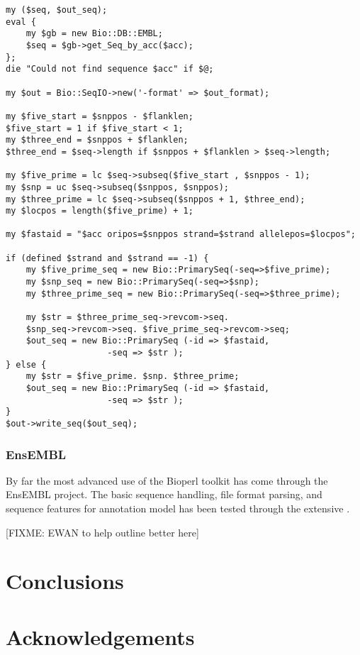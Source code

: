 \documentclass{article}
\begin{document}
\begin{twocolumn}
\begin{itemize}
\begin{scriptsize}
\begin{verbatim}
my ($seq, $out_seq);
eval {
    my $gb = new Bio::DB::EMBL;
    $seq = $gb->get_Seq_by_acc($acc);
};
die "Could not find sequence $acc" if $@;

my $out = Bio::SeqIO->new('-format' => $out_format);

my $five_start = $snppos - $flanklen;
$five_start = 1 if $five_start < 1;
my $three_end = $snppos + $flanklen;
$three_end = $seq->length if $snppos + $flanklen > $seq->length;

my $five_prime = lc $seq->subseq($five_start , $snppos - 1);
my $snp = uc $seq->subseq($snppos, $snppos);
my $three_prime = lc $seq->subseq($snppos + 1, $three_end); 
my $locpos = length($five_prime) + 1;

my $fastaid = "$acc oripos=$snppos strand=$strand allelepos=$locpos";

if (defined $strand and $strand == -1) {
    my $five_prime_seq = new Bio::PrimarySeq(-seq=>$five_prime);
    my $snp_seq = new Bio::PrimarySeq(-seq=>$snp);
    my $three_prime_seq = new Bio::PrimarySeq(-seq=>$three_prime);

    my $str = $three_prime_seq->revcom->seq. 
	$snp_seq->revcom->seq. $five_prime_seq->revcom->seq;
    $out_seq = new Bio::PrimarySeq (-id => $fastaid,
				    -seq => $str );
} else {
    my $str = $five_prime. $snp. $three_prime;
    $out_seq = new Bio::PrimarySeq (-id => $fastaid,
				    -seq => $str );
}
$out->write_seq($out_seq);

\end{verbatim}
\end{scriptsize}

\end{itemize}

\subsubsection{EnsEMBL}

By far the most advanced use of the Bioperl toolkit has come through
the EnsEMBL project.  The basic sequence handling, file format
parsing, and sequence features for annotation model has been tested
through the extensive .

[FIXME: EWAN to help outline better here]


\section{Conclusions}

\section{Acknowledgements}


\end{twocolumn}
\end{document}
